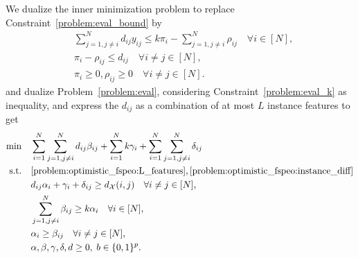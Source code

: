 \documentclass[11pt, a4paper]{article}
\newcommand{\FRil}[1]{\todo[color=black, textcolor=white, inline, author=FR]{#1}}
\newcommand{\X}{{\mathcal{X}}} %
\newcommand{\instanceindex}{i}
\newcommand{\instanceindextwo}{j}
\newcommand{\soldist}[1][(\instanceindex,\instanceindextwo)]{d_\X#1} %
\begin{document}
We dualize the inner minimization problem to replace Constraint~\eqref{problem:eval_bound} by
\begin{subequations}\label{problem:eval_dualize_inner}
	\begin{align}
		& \sum_{j=1, j\neq i}^N d_{ij}y_{ij} \leq k \pi_i - \sum_{j=1, j\neq i}^N \rho_{ij} \quad \forall i\in [N],\\
		&\pi_i - \rho_{ij} \leq d_{ij} \quad \forall i\neq j\in [N],\\
		& \pi_i \geq 0, \rho_{ij} \geq 0 \quad \forall i\neq j\in [N].
	\end{align}
\end{subequations}
and dualize Problem~\eqref{problem:eval}, considering Constraint~\eqref{problem:eval_k} as inequality, and express the $d_{ij}$ as a combination of at most $L$ instance features to get
\begin{subequations}\label{problem:eval_dualize_outer}
	\begin{align}
		\min \quad & \sum_{i=1}^N \sum_{j=1,j\neq i}^N d_{ij} \beta_{ij} + \sum_{i=1}^N k \gamma_i + \sum_{i=1}^N \sum_{j=1, j\neq i}^N \delta_{ij}\\
		\nonumber\text{s.t.} \quad & \eqref{problem:optimistic_fspeo:L_features}, \eqref{problem:optimistic_fspeo:instance_diff}\\
		\label{problem:eval_dualize_outer:b_cons}& d_{ij} \alpha_i + \gamma_i + \delta_{ij} \geq \soldist\quad \forall i\neq j\in [N],\\
		\label{problem:eval_dualize_outer:alpha_bound}& \sum_{j=1,j\neq i}^N \beta_{ij} \geq k \alpha_i \quad \forall i\in [N],\\
		\label{problem:eval_dualize_outer:beta_bound}& \alpha_i \geq \beta_{ij} \quad \forall i\neq j\in [N],\\
		&\alpha, \beta, \gamma, \delta, d \geq 0, \;b \in \{0, 1\}^{p}.
	\end{align}
\end{subequations}
\end{document}

